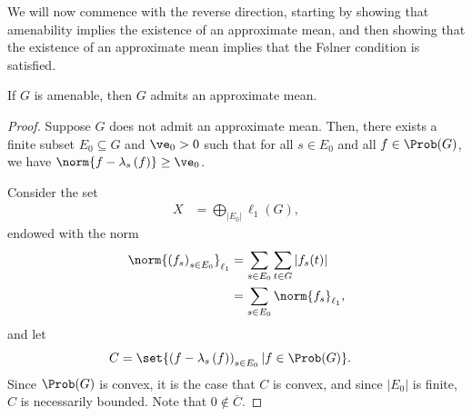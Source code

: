 We will now commence with the reverse direction, starting by showing that amenability implies the existence of an approximate mean, and then showing that the existence of an approximate mean implies that the Følner condition is satisfied.
\begin{proposition}\label{prop:amenable_implies_approx_mean}
  If $G$ is amenable, then $G$ admits an approximate mean.
\end{proposition}
\begin{proof}
  Suppose $G$ does not admit an approximate mean. Then, there exists a finite subset $E_0\subseteq G$ and $\ve_0 > 0$ such that for all $s\in E_0$ and all $f\in \Prob(G)$, we have $\norm{f - \lambda_s\left(f\right)} \geq \ve_0$.\newline

  Consider the set
  \begin{align*}
    X &= \bigoplus_{\left\vert E_0 \right\vert} \ell_1\left(G\right),
  \end{align*}
  endowed with the norm
  \begin{align*}
    \norm{\left(f_s\right)_{s\in E_0}}_{\ell_1} &= \sum_{s\in E_0}\sum_{t\in G}\left\vert f_s(t) \right\vert\\
                                       &= \sum_{s\in E_0}\norm{f_s}_{\ell_1},
  \end{align*}
  and let
  \begin{align*}
    C &= \set{\left(f - \lambda_s\left(f\right)\right)_{s\in E_0} | f\in \Prob(G)}.
  \end{align*}
  Since $\Prob(G)$ is convex, it is the case that $C$ is convex, and since $\left\vert E_0 \right\vert$ is finite, $C$ is necessarily bounded. Note that $0\notin \overline{C}$.\newline


\end{proof}
